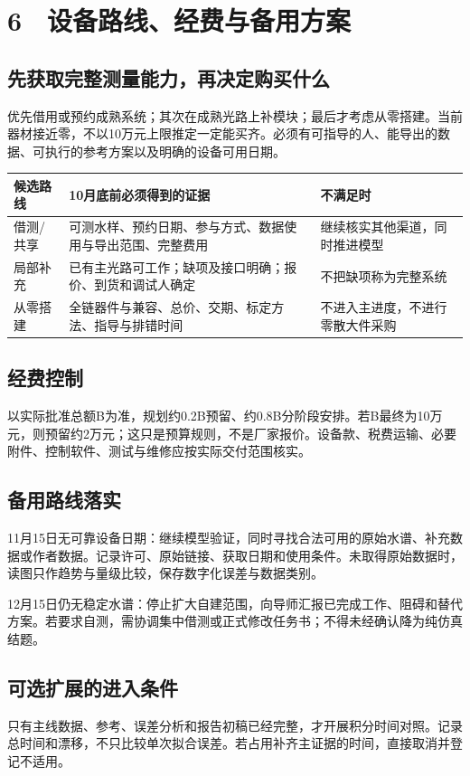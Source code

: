 \documentclass[UTF8,a4paper,11pt,fontset=fandol]{ctexart}
\begin{document}
\clearpage
\section*{6　设备路线、经费与备用方案}
\subsection*{先获取完整测量能力，再决定购买什么}
优先借用或预约成熟系统；其次在成熟光路上补模块；最后才考虑从零搭建。当前器材接近零，不以10万元上限推定一定能买齐。必须有可指导的人、能导出的数据、可执行的参考方案以及明确的设备可用日期。

\begin{longtable}{P{2.4cm}P{8.0cm}P{3.7cm}}
\toprule
\textbf{候选路线} & \textbf{10月底前必须得到的证据} & \textbf{不满足时}\\\midrule\endhead
借测/共享 & 可测水样、预约日期、参与方式、数据使用与导出范围、完整费用 & 继续核实其他渠道，同时推进模型\\[0.35em]
局部补充 & 已有主光路可工作；缺项及接口明确；报价、到货和调试人确定 & 不把缺项称为完整系统\\[0.35em]
从零搭建 & 全链器件与兼容、总价、交期、标定方法、指导与排错时间 & 不进入主进度，不进行零散大件采购\\[0.35em]
\bottomrule\end{longtable}
\subsection*{经费控制}
以实际批准总额B为准，规划约0.2B预留、约0.8B分阶段安排。若B最终为10万元，则预留约2万元；这只是预算规则，不是厂家报价。设备款、税费运输、必要附件、控制软件、测试与维修应按实际交付范围核实。

\subsection*{备用路线落实}
11月15日无可靠设备日期：继续模型验证，同时寻找合法可用的原始水谱、补充数据或作者数据。记录许可、原始链接、获取日期和使用条件。未取得原始数据时，读图只作趋势与量级比较，保存数字化误差与数据类别。

12月15日仍无稳定水谱：停止扩大自建范围，向导师汇报已完成工作、阻碍和替代方案。若要求自测，需协调集中借测或正式修改任务书；不得未经确认降为纯仿真结题。

\subsection*{可选扩展的进入条件}
只有主线数据、参考、误差分析和报告初稿已经完整，才开展积分时间对照。记录总时间和漂移，不只比较单次拟合误差。若占用补齐主证据的时间，直接取消并登记不适用。
\end{document}
